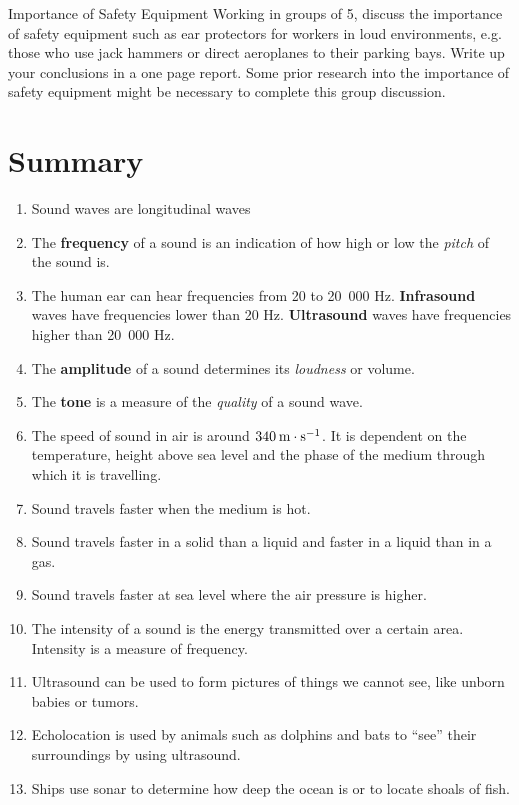 \pagebreak
\begin{groupdiscussion}{Importance of Safety Equipment }
\label{m38800*id185111}Working in groups of 5, discuss the importance of safety equipment such as ear protectors for workers in loud environments, e.g. those who use jack hammers or direct aeroplanes to their parking bays. Write up your conclusions in a one page report. Some prior research into the importance of safety equipment might be necessary to complete this group discussion. 
\end{groupdiscussion} 
            \section{Summary}
            \nopagebreak
      \label{m38800*id185628}\begin{enumerate}[noitemsep, label=\textbf{\arabic*}. ] 
            \label{m38800*uid14}\item Sound waves are longitudinal waves
\label{m38800*uid15}\item The \textbf{frequency} of a sound is an indication of how high or low the \textsl{pitch} of the sound is.
\label{m38800*uid16}\item The human ear can hear frequencies from 20 to 20~000 Hz.
\textbf{Infrasound} waves have frequencies lower than 20 Hz.
\textbf{Ultrasound} waves have frequencies higher than 20~000 Hz.
\label{m38800*uid17}\item The \textbf{amplitude} of a sound determines its \textsl{loudness} or volume.
\label{m38800*uid18}\item The \textbf{tone} is a measure of the \textsl{quality} of a sound wave.
\label{m38800*uid19}\item The speed of sound in air is around $340\phantom{\rule{2pt}{0ex}}\text{m}\ensuremath{\cdot}\text{s}{}^{-1}$. It is dependent on the temperature, height above sea level and the phase of the medium through which it is travelling.
\label{m38800*uid20}\item Sound travels faster when the medium is hot.
\label{m38800*uid21}\item Sound travels faster in a solid than a liquid and faster in a liquid than in a gas.
\label{m38800*uid22}\item Sound travels faster at sea level where the air pressure is higher.
\label{m38800*uid23}\item The intensity of a sound is the energy transmitted over a certain area. Intensity is a measure of frequency.
\label{m38800*uid24}\item Ultrasound can be used to form pictures of things we cannot see, like unborn babies or tumors.
\label{m38800*uid25}\item Echolocation is used by animals such as dolphins and bats to ``see'' their surroundings by using ultrasound.
\label{m38800*uid26}\item Ships use sonar to determine how deep the ocean is or to locate shoals of fish.
\end{enumerate}
    \label{m38800*cid9}
            


